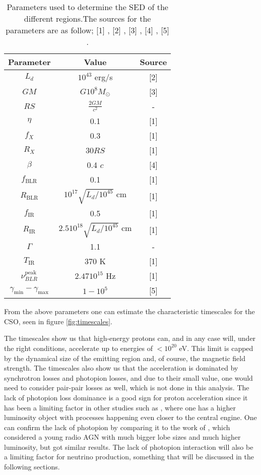 \begin{table}
    \centering
    \begin{tabular}{|c|c|c|}
        \hline
        Parameter & Value & Source \\
        \hline
        $L_{d}$ & $10^{43}$ erg/s & [2] \\
        $GM$ & $G 10^{8} M_{\odot}$ &[3]\\
        $RS$ & $\frac{2GM}{c^2}$ & - \\
        $\eta$ & 0.1 & [1]\\
        $f_{X}$ & 0.3 & [1]\\
        $R_{X}$ & 30$ RS $ & [1]\\
        $\beta$ & 0.4 $c$ &[4]\\
        $f_{\text{BLR}}$ & 0.1  &[1]\\
        $R_{\text{BLR}}$ & $10^{17} \sqrt{L_{d}/10^{45}}$ cm &[1]\\
        $f_{\text{IR}}$ & 0.5&[1] \\
        $R_{\text{IR}}$ & $2.5 10^{18}\sqrt{L_{d}/10^{45}}$ cm &[1] \\
        $\Gamma$ & 1.1 & -\\
        $T_{\text{IR}} $ & $ 370$ K &[1]\\ 
        $\nu_{BLR}^{\text{peak}} $ & $ 2.47 10^{15}$ Hz  & [1]\\
        $\gamma_{\text{min}} - \gamma_{\text{max}}$ & $1 - 10^5$ & [5]\\ 
        \hline
    \end{tabular}
    \caption{Parameters used to determine the SED of the different regions.The sources for the parameters are as follow; [1] \cite{Ghisellini_2009}, [2] \cite{bronzini2024investigating}, [3] \cite{W_jtowicz_2020}, [4] \cite{sullivan2024smallscale}, [5] \cite{BHradiation}.}
    \label{tab:SED_params}
\end{table}


From the above parameters one can estimate the characteristic timescales for the CSO, seen in figure \ref{fig:timescales}. 

The timescales show us that high-energy protons can, and in any case will, under the right conditions, accelerate up to energies of $<10^{20}$ eV. This limit is capped by the dynamical size of the emitting region and, of course, the magnetic field strength. The timescales also show us that the acceleration is dominated by synchrotron losses and photopion losses, and due to their small value, one would need to consider pair-pair losses as well, which is not done in this analysis. The lack of photopion loss dominance is a good sign for proton acceleration since it has been a limiting factor in other studies such as \cite{peretti2023diffusive}, where one has a higher luminosity object with processes happening even closer to the central engine. One can confirm the lack of photopion by comparing it to the work of \cite{TAKAMI2011749}, which considered a young radio AGN with much bigger lobe sizes and much higher luminosity, but got similar results. The lack of photopion interaction will also be a limiting factor for neutrino production, something that will be discussed in the following sections.

